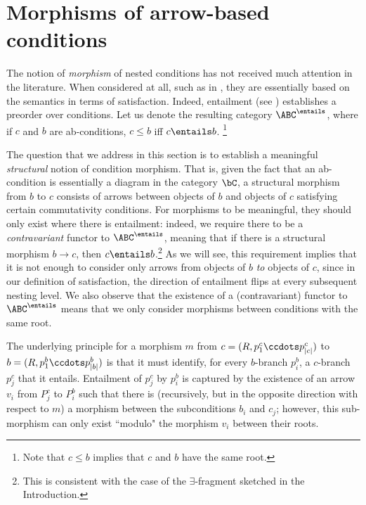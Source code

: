 \section{Morphisms of arrow-based conditions}

The notion of \emph{morphism} of nested conditions has not received much attention in the literature. When considered at all, such as in \cite{bchk:conditional-reactive-systems,sksclo:coinductive-techniques-for-satisfiability}, they are essentially based on the semantics in terms of satisfaction. Indeed, entailment (see ) establishes a preorder over conditions. Let us denote the resulting category $\ABC^{\entails}$, where if $c$ and $b$ are ab-conditions, $c \leq b$ iff $c \entails b$.%
\footnote{Note that $c \leq b$ implies that $c$ and $b$ have the same root.} 

The question that we address in this section is to establish a meaningful \emph{structural} notion of condition morphism. That is, given the fact that an ab-condition is essentially a diagram in the category $\bC$, a structural morphism from $b$ to $c$ consists of arrows between objects of $b$ and objects of $c$ satisfying certain commutativity conditions. For morphisms to be meaningful,  they should only exist where there is entailment: indeed, we require there to be a \emph{contravariant} functor to $\ABC^{\entails}$, meaning that if there is a structural morphism $b \to c$, then $c \entails b$.\footnote{This is consistent with the case of the $\exists$-fragment sketched in the Introduction.} As we will see, this requirement implies that it is not enough to consider only arrows from objects of $b$ \emph{to} objects of $c$, since in our definition of satisfaction, the direction of entailment flips at every subsequent nesting level. We also observe that the existence of a (contravariant) functor to $\ABC^{\entails}$ means that we only consider morphisms between conditions with the same root.

The underlying principle for a morphism $m$ from $c=(R,p^c_1\ccdots p^c_{|c|})$  to $b=(R,p^b_1\ccdots p^b_{|b|})$  is that it must identify, for every $b$-branch $p^b_i$, a $c$-branch $p^c_j$ that it entails. Entailment of $p^c_j$ by $p^b_i$ is captured by the existence of an arrow $v_i$ from $P^c_j$ to $P^b_i$  such that there is (recursively, but in the opposite direction with respect to $m$) a morphism between the subconditions $b_i$ and $c_j$; however, this sub-morphism can only exist ``modulo" the morphism $v_i$ between their roots. 

